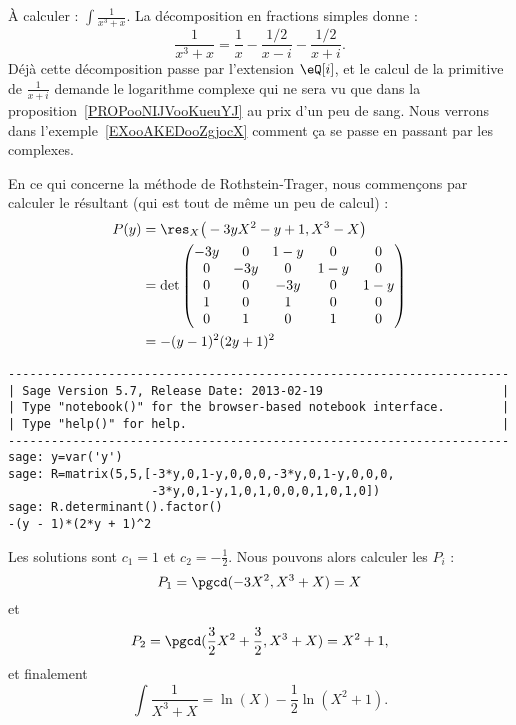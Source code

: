 \begin{example}     \label{EXooIPEQooGKDjea}
	À calculer : \( \int\frac{1}{ x^3+x }\). La décomposition en fractions simples donne :
	\begin{equation}
		\frac{1}{ x^3+x }= \frac{1}{ x }-\frac{ 1/2 }{ x-i }-\frac{ 1/2 }{ x+i }.
	\end{equation}
	Déjà cette décomposition passe par l'extension \( \eQ[i]\), et le calcul de la primitive de \( \frac{1}{ x+i }\) demande le logarithme complexe qui ne sera vu que dans la proposition~\ref{PROPooNIJVooKueuYJ} au prix d'un peu de sang.
	Nous verrons dans l'exemple~\ref{EXooAKEDooZgjocX} comment ça se passe en passant par les complexes.

	En ce qui concerne la méthode de Rothstein-Trager, nous commençons par calculer le résultant (qui est tout de même un peu de calcul) :
	\begin{subequations}
		\begin{align}
			P(y) & =\res_X\big( -3yX^2-y+1,X^3-X \big) \\
			     & =\det\begin{pmatrix}
				            -3y & 0   & 1-y & 0   & 0   \\
				            0   & -3y & 0   & 1-y & 0   \\
				            0   & 0   & -3y & 0   & 1-y \\
				            1   & 0   & 1   & 0   & 0   \\
				            0   & 1   & 0   & 1   & 0
			            \end{pmatrix}    \\
			     & =-(y-1)^2(2y+1)^2
		\end{align}
	\end{subequations}

	\begin{verbatim}
----------------------------------------------------------------------
| Sage Version 5.7, Release Date: 2013-02-19                         |
| Type "notebook()" for the browser-based notebook interface.        |
| Type "help()" for help.                                            |
----------------------------------------------------------------------
sage: y=var('y')
sage: R=matrix(5,5,[-3*y,0,1-y,0,0,0,-3*y,0,1-y,0,0,0,
                    -3*y,0,1-y,1,0,1,0,0,0,1,0,1,0])
sage: R.determinant().factor()
-(y - 1)*(2*y + 1)^2
    \end{verbatim}
	Les solutions sont \( c_1=1\) et \( c_2=-\frac{ 1 }{2}\). Nous pouvons alors calculer les \( P_i\) :
	\begin{equation}
		P_1=\pgcd(-3X^2,X^3+X)=X
	\end{equation}
	et
	\begin{equation}
		P_2=\pgcd(\frac{ 3 }{2}X^2+\frac{ 3 }{2},X^3+X)=X^2+1,
	\end{equation}
	et finalement
	\begin{equation}
		\int\frac{ 1 }{ X^3+X }=\ln(X)-\frac{ 1 }{2}\ln(X^2+1).
	\end{equation}
\end{example}

